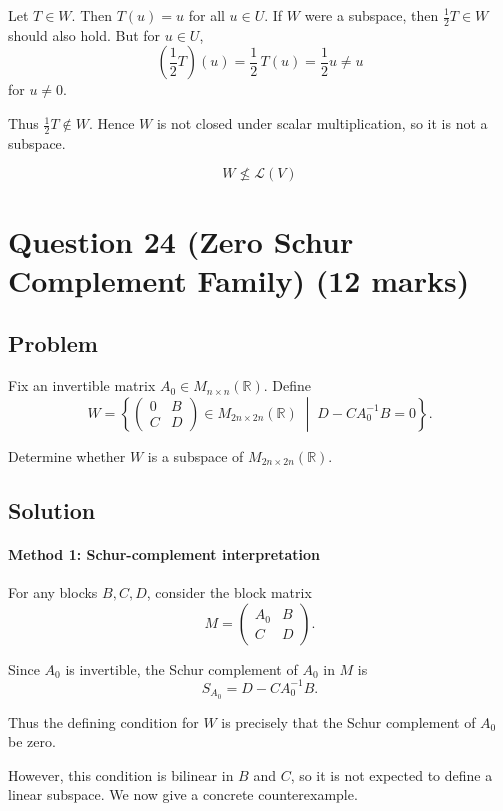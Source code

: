 \documentclass[12pt]{article}
\begin{document}
Let \(T\in W\). Then \(T(u)=u\) for all \(u\in U\). If \(W\) were a subspace, then \(\frac12 T\in W\) should also hold. But for \(u\in U\),
\[
\left(\frac12 T\right)(u)=\frac12\,T(u)=\frac12 u\neq u
\]
for \(u\neq0\).

Thus \(\frac12 T\notin W\). Hence \(W\) is not closed under scalar multiplication, so it is not a subspace.

\[
\boxed{W\not\le \mathcal L(V)}
\]

\newpage
\section{Question 24 (Zero Schur Complement Family) \hfill (12 marks)}
\subsection{Problem}

Fix an invertible matrix \(A_0\in M_{n\times n}(\mathbb R)\). Define
\[
W=
\left\{
\begin{pmatrix}
0 & B\\
C & D
\end{pmatrix}
\in M_{2n\times 2n}(\mathbb R)
\;\middle|\;
D-CA_0^{-1}B=0
\right\}.
\]

Determine whether \(W\) is a subspace of \(M_{2n\times 2n}(\mathbb R)\).

\subsection{Solution}

\paragraph{Method 1: Schur-complement interpretation}

For any blocks \(B,C,D\), consider the block matrix
\[
M=
\begin{pmatrix}
A_0 & B\\
C & D
\end{pmatrix}.
\]

Since \(A_0\) is invertible, the Schur complement of \(A_0\) in \(M\) is
\[
S_{A_0}=D-CA_0^{-1}B.
\]

Thus the defining condition for \(W\) is precisely that the Schur complement of \(A_0\) be zero.

However, this condition is bilinear in \(B\) and \(C\), so it is not expected to define a linear subspace. We now give a concrete counterexample.
\end{document}
